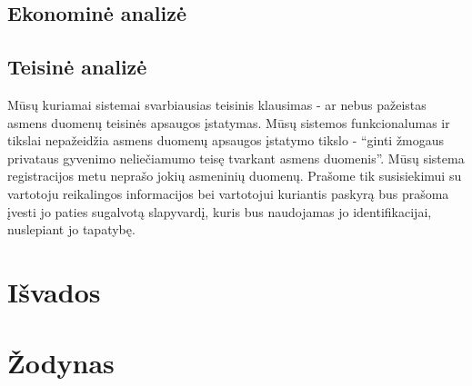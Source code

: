 \documentclass[oneside]{VUMIFPSkursinis}
\begin{document}
	\subsection{Ekonominė analizė}
	\subsection{Teisinė analizė}
Mūsų kuriamai sistemai svarbiausias teisinis klausimas - ar nebus pažeistas asmens duomenų teisinės apsaugos įstatymas. Mūsų sistemos funkcionalumas ir tikslai nepažeidžia asmens duomenų apsaugos įstatymo tikslo - “ginti žmogaus privataus gyvenimo neliečiamumo teisę tvarkant asmens duomenis”. Mūsų sistema registracijos metu neprašo jokių asmeninių duomenų. Prašome tik susisiekimui su vartotoju reikalingos informacijos bei vartotojui kuriantis paskyrą bus prašoma įvesti jo paties sugalvotą slapyvardį, kuris bus naudojamas jo identifikacijai, nuslepiant jo tapatybę.
\section{Išvados}
\section{Žodynas}
\end{document}
